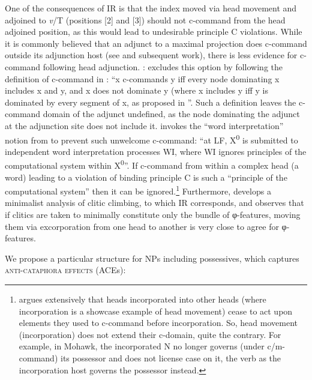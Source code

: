 \documentclass[output=paper,modfonts,nonflat
]{langsci/langscibook}
\begin{document}
One of the consequences of IR is that the index moved via head movement and adjoined to \textit{v}/T (positions [2] and [3]) should not c-command from the head adjoined position, as this would lead to undesirable principle C violations. While it is commonly believed that an adjunct to a maximal projection does c-command outside its adjunction host (see \citealt{kayne1994} and subsequent work), there is less evidence for c-command following head adjunction. \cite[93--94]{nikolaeva2014}: excludes this option by following the definition of c-command in \cite[574]{hestvik1992}: ``x c-commands y iff every node dominating x includes x and y, and x does not dominate y (where x includes y iff y is dominated by every segment of x, as proposed in \cite{may1985}''. Such a definition leaves the c-command domain of the adjunct undefined, as the node dominating the adjunct at the adjunction site does not include it. \cite{citkoetal2018} invokes the ``word interpretation'' notion from \cite[322]{chomsky1995} to prevent such unwelcome c-command: ``at LF, X\textsuperscript{0} is submitted to independent word interpretation processes WI, where WI ignores principles of the computational system within  X\textsuperscript{0}''. If c-command from within a complex head (a word) leading to a violation of binding principle C is such a ``principle of the computational system'' then it can be ignored.\footnote{\label{fn15}\cite{baker1988} argues extensively that heads incorporated into other heads (where incorporation is a showcase example of head movement) cease to act upon elements they used to c-command before incorporation. So, head movement (incorporation) does not extend their c-domain, quite the contrary. For example, in Mohawk, the incorporated N no longer governs (under c/m-command) its possessor and does not license case on it, the verb as the incorporation host governs the possessor instead.}
Furthermore, \cite{roberts2009} develops a minimalist analysis of clitic climbing, to which IR corresponds, and observes that if clitics are taken to minimally constitute only the bundle of φ-features, moving them via excorporation from one head to another is very close to agree for φ-features. 

We propose a particular structure for NPs including possessives, which captures \textsc{anti-}\textsc{cataphora} \textsc{effects} (ACEs):

\z
                
\end{document}
